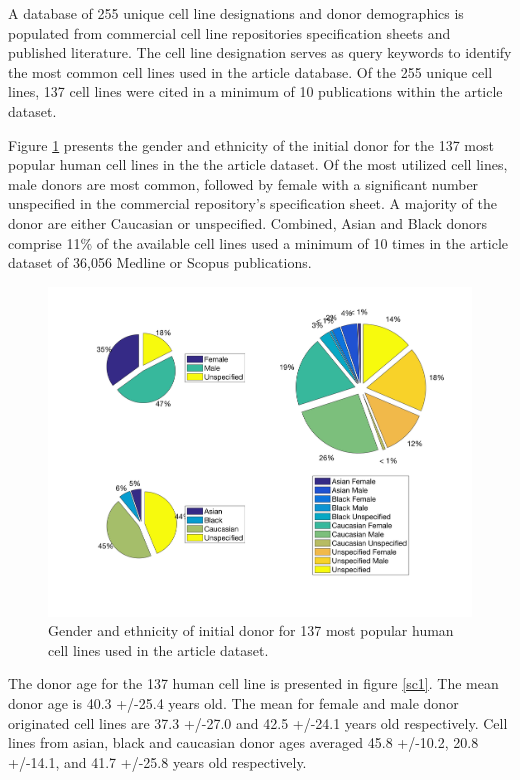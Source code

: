 \documentclass[10pt]{article}
\begin{document}
A database of 255 unique cell line designations and donor demographics is populated from commercial cell line repositories specification sheets and published literature. The cell line designation serves as query keywords to identify the most common cell lines used in the article database. Of the 255 unique cell lines, 137 cell lines were cited in a minimum of 10 publications within the article dataset. 

Figure \ref{pc3} presents the gender and ethnicity of the initial donor for the 137 most popular human cell lines in the the article dataset. Of the most utilized cell lines, male donors are most common, followed by female with a significant number unspecified in the commercial repository's specification sheet. A majority of the donor are either Caucasian or unspecified. Combined, Asian and Black donors comprise 11\% of the available cell lines used a minimum of 10 times in the article dataset of 36,056 Medline or Scopus publications. 

\begin{figure}[h!]
\centering
\includegraphics[width=0.98\columnwidth]{Figures/PieChart_3}
\caption{\label{pc3}Gender and ethnicity of initial donor for 137 most popular human cell lines used in the article dataset.}
\end{figure}

The donor age for the 137 human cell line is presented in figure \ref{sc1}. The mean donor age is 40.3 +/-25.4 years old. The mean for female and male donor originated cell lines are 37.3 +/-27.0 and 42.5 +/-24.1 years old respectively. Cell lines from asian, black and caucasian donor ages averaged 45.8 +/-10.2, 20.8 +/-14.1, and 41.7 +/-25.8 years old respectively. 
\end{document}
